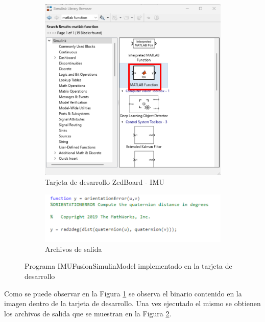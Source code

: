 \begin{figure}[htbp]
    \centering
    \begin{subfigure}[b]{0.35\textwidth}
        \centering
        \includegraphics[width=\textwidth]{fig/Capitulo5/Caso_de_estudio_IMU/Generador_de_salidas/libreria_bloque_de_funcion.pdf}
        \caption{Tarjeta de desarrollo ZedBoard - IMU}
        \label{fig:imu_zedboard}
    \end{subfigure}
    \hfill
    \begin{subfigure}[b]{0.45\textwidth}
        \centering
        \includegraphics[width=\textwidth]{fig/Capitulo5/Caso_de_estudio_IMU/Generador_de_salidas/configuracion_codigo.pdf}
        \caption{Archivos de salida}
        \label{fig:out_files_IMU}
    \end{subfigure}
    \caption{Programa IMUFusionSimulinModel implementado en la tarjeta de desarrollo}
    \label{fig:IMU_ZEDBOARD}
\end{figure}
Como se puede observar en la Figura \ref{fig:imu_zedboard} se observa el binario contenido en la imagen dentro de la tarjeta de desarrollo. Una vez ejecutado el mismo se obtienen los archivos de salida que se muestran en la Figura \ref{fig:out_files_IMU}. 

